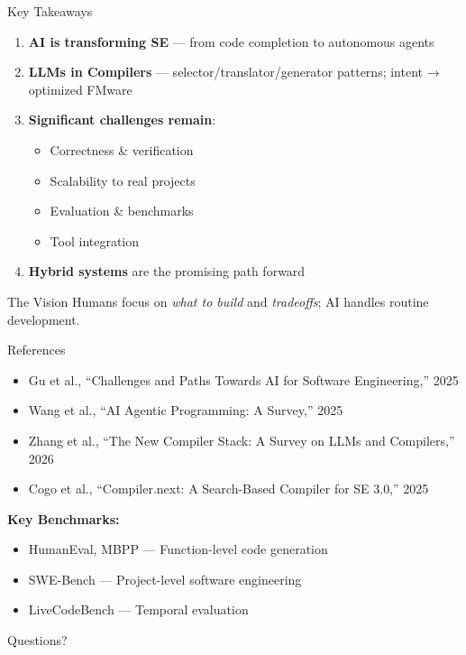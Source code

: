 \documentclass[aspectratio=169,10pt]{beamer}
\begin{document}
\begin{frame}{Key Takeaways}
    \begin{enumerate}
        \item \textbf{AI is transforming SE} — from code completion to autonomous agents
        
        \item \textbf{LLMs in Compilers} — selector/translator/generator patterns; intent → optimized FMware
        
        \item \textbf{Significant challenges remain}:
        \begin{itemize}
            \item Correctness \& verification
            \item Scalability to real projects
            \item Evaluation \& benchmarks
            \item Tool integration
        \end{itemize}
        
        \item \textbf{Hybrid systems} are the promising path forward
    \end{enumerate}
    
    \begin{block}{The Vision}
    Humans focus on \textit{what to build} and \textit{tradeoffs}; AI handles routine development.\strut
    \end{block}
\end{frame}

\begin{frame}{References}
    \small
    \begin{itemize}
        \item Gu et al., ``Challenges and Paths Towards AI for Software Engineering,'' 2025
        \item Wang et al., ``AI Agentic Programming: A Survey,'' 2025
        \item Zhang et al., ``The New Compiler Stack: A Survey on LLMs and Compilers,'' 2026
        \item Cogo et al., ``Compiler.next: A Search-Based Compiler for SE 3.0,'' 2025
    \end{itemize}
    
    \vspace{1em}
    \textbf{Key Benchmarks:}
    \begin{itemize}
        \item HumanEval, MBPP — Function-level code generation
        \item SWE-Bench — Project-level software engineering
        \item LiveCodeBench — Temporal evaluation
    \end{itemize}
\end{frame}

\begin{frame}[standout]
    Questions?
\end{frame}
\end{document}

